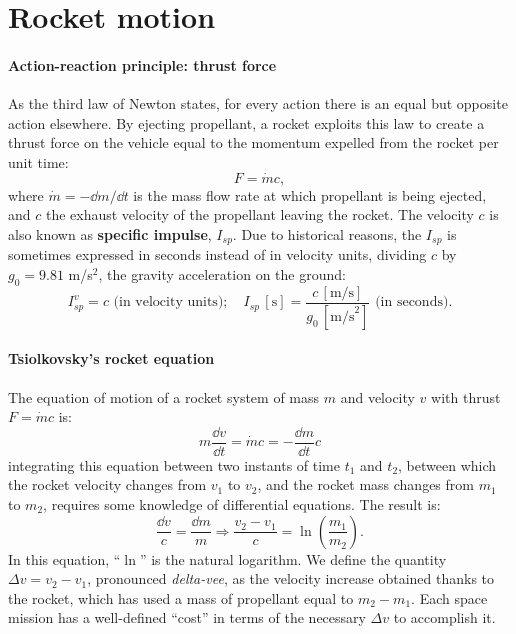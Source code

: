\section[Rockets]{Rocket motion}
 
\paragraph{Action-reaction principle: thrust force}

As the third law of Newton states, for every action there is an equal but
opposite action elsewhere. By ejecting propellant, a rocket exploits this law
to create a  thrust force on the vehicle equal to the momentum expelled from
the rocket per unit time:
%
\begin{equation}
F = \dot{m} c,
\end{equation}
%
where $\dot{m}=-\dd m/\dd t$ is the mass flow rate at which propellant 
is being ejected, and
$c$ the exhaust velocity of the propellant leaving the rocket.
The velocity $c$ is also known as \textbf{specific impulse}, $I_{sp}$. 
Due to historical reasons, the $I_{sp}$ is sometimes expressed in seconds
instead of in velocity units, dividing $c$ by $g_0=9.81$ m/s$^2$,
the gravity acceleration on the ground:
%
\begin{equation}
I_{sp}^v = c \mbox{ (in velocity units)}; \quad 
I_{sp} \,[\mbox{s}] = \frac{c \,[\mbox{m/s}]}{g_0 \,[\mbox{m/s}^2]}
\mbox{ (in seconds)}.
\end{equation}

\paragraph{Tsiolkovsky's rocket equation}

The equation of motion of a rocket system of mass $m$ and velocity $v$ with 
thrust $F=\dot{m}c$ is:
%
\begin{equation}
m\frac{\dd v}{\dd t} = \dot{m}c = -\frac{\dd m}{\dd t} c
\end{equation}
%
integrating this equation between two instants of time $t_1$ and $t_2$, 
between which the rocket velocity changes from $v_1$ to $v_2$, and
the rocket mass changes from $m_1$ to $m_2$,
requires some knowledge of differential equations. 
The result is:
%
\begin{equation}
\frac{\dd v}{c} = \frac{\dd m}{m} \Rightarrow \frac{v_2-v_1}{c}
=\ln\left(\frac{m_1}{m_2}\right).
\end{equation}
%
In this equation, ``$\ln$'' is the natural logarithm. We define the quantity
$\Delta v = v_2-v_1$, pronounced \emph{delta-vee}, as
the velocity increase obtained thanks to the rocket, which 
has used a mass of propellant equal to $m_2-m_1$.
Each space mission has a well-defined ``cost'' in terms of the 
necessary $\Delta v$ to accomplish it.

